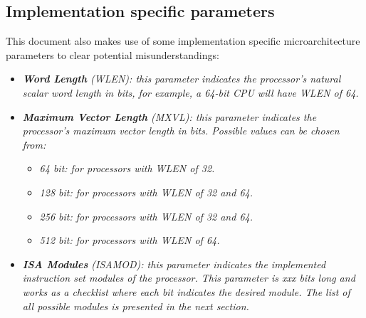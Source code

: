     \subsection[Implementation specific parameters]{Implementation specific parameters}

        \vspace{10pt}

        This document also makes use of some implementation specific microarchitecture parameters to clear potential misunderstandings:

        \begin{itemize}

            \item \textit{\textbf{Word Length} (WLEN): this parameter indicates the processor's natural scalar word length in bits, for example, a 64-bit CPU will have WLEN of 64.}

            \item \textit{\textbf{Maximum Vector Length} (MXVL): this parameter indicates the processor's maximum vector length in bits. Possible values can be chosen from:}

                \begin{itemize}

                    \item \textit{64 bit: for processors with WLEN of 32.}
                    \item \textit{128 bit: for processors with WLEN of 32 and 64.}
                    \item \textit{256 bit: for processors with WLEN of 32 and 64.}
                    \item \textit{512 bit: for processors with WLEN of 64.}

                \end{itemize}

            \item \textit{\textbf{ISA Modules} (ISAMOD): this parameter indicates the implemented instruction set modules of the processor. This parameter is xxx bits long and works as a checklist where each bit indicates the desired module. The list of all possible modules is presented in the next section.}

        \end{itemize}

